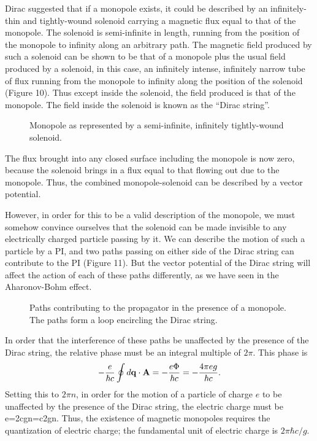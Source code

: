 \documentclass[12pt]{article}
\begin{document}
Dirac suggested that if a monopole exists, it could be described by an
infinitely-thin and tightly-wound solenoid carrying a magnetic flux
equal to that of the monopole. The solenoid is semi-infinite in
length, running from the position of the monopole to infinity along an
arbitrary path. The magnetic
field produced by such a solenoid can be shown to be that of a
monopole plus the usual field produced by a solenoid, in this case,
an infinitely intense, infinitely narrow tube of flux running from the
monopole to infinity along the position of the solenoid
(Figure 10). Thus except inside the solenoid,
the field produced is that of the monopole. The field inside the
solenoid is known as the ``Dirac string''.
\begin{figure}[hb]
\epsfysize=7cm
\centerline{}
\caption{Monopole as represented by a semi-infinite, infinitely
  tightly-wound solenoid.}
\end{figure}
The flux brought into any closed surface including the monopole is
now zero, because the solenoid brings in a flux equal to that
flowing out due to the monopole. Thus, the combined monopole-solenoid
can be described by a vector potential.

However, in order for this to be a valid description of the monopole,
we must somehow convince
ourselves that the solenoid can be made invisible to any electrically
charged particle
passing by it. We can describe the motion of
such a particle by a PI, and
two paths passing on either side of the Dirac string can contribute to
the PI (Figure 11). But the vector potential of the Dirac string will
affect the action of each of these paths differently, as we have seen
in the Aharonov-Bohm effect.
\begin{figure}[hb]
\epsfysize=4cm
\centerline{}
\caption{Paths contributing to the propagator in the presence of a
  monopole. The paths form a loop encircling the Dirac string.}
\end{figure}

In order that the interference of these paths be unaffected by the
presence of the Dirac string, the relative phase must be an integral
multiple of $2\pi$. This phase is
\[ -{e\over\hbar c}\oint d{\mathbf q}\cdot{\mathbf A}=-{e\Phi\over\hbar c}
=-{4\pi eg\over\hbar c}.
\]
Setting this to $2\pi n$, in order for the motion of a particle of
charge $e$ to be unaffected by the presence of the Dirac string, the
electric charge must be
\beq
e={2\pi\hbar c\pi g}n={\hbar c\over2g}n.
\label{quantcond}
\eeq
Thus, the existence of magnetic monopoles requires the quantization of
electric charge; the fundamental unit of electric charge is $2\pi\hbar
c/g$.
\end{document}
